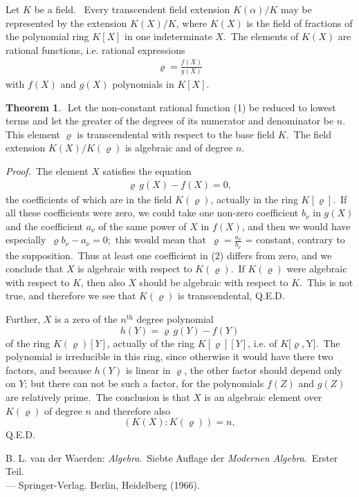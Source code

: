 \documentclass[12pt]{article}
\theoremstyle{definition}
\newtheorem*{thmplain}{Theorem}
\begin{document}
Let $K$ be a field. \, Every  transcendent field extension $K(\alpha)/K$ may be represented by the extension $K(X)/K$, where $K(X)$ is the field of fractions of the polynomial ring $K[X]$ in one indeterminate $X$. \,The elements of $K(X)$ are rational functions, i.e. rational expressions
\begin{align}
\varrho = \frac{f(X)}{g(X)}
\end{align}
with $f(X)$ and $g(X)$ polynomials in $K[X]$.

\begin{thmplain}
\,\,Let the non-constant rational function (1) be reduced to lowest terms and let the greater of the degrees of its numerator and denominator be $n$. \,This element $\varrho$ is transcendental with respect to the base field $K$. \,The field extension $K(X)/K(\varrho)$ is algebraic and of degree $n$.
\end{thmplain}

{\em Proof.}\, The element $X$ satisfies the equation
\begin{align}
                \varrho\,g(X)\!-\!f(X) = 0,
\end{align}
the coefficients of which are in the field $K(\varrho)$, actually in the ring $K[\varrho]$.\, If all these coefficients were zero, we could take one non-zero coefficient $b_\nu$ in $g(X)$ and the coefficient $a_\nu$ of the same power of $X$ in $f(X)$, and then we would have especially\, $\varrho b_\nu\!-a_\nu = 0$;\, this would mean that\, $\varrho = \frac{a_\nu}{b_\nu}$ = constant, contrary to the supposition.\, Thus at least one coefficient in (2) differs from zero, and we conclude that $X$ is algebraic with respect to $K(\varrho)$.\, If $K(\varrho)$ were algebraic with respect to $K$, then also $X$ should be algebraic with respect to $K$.\, This is not true, and therefore we see that $K(\varrho)$ is transcendental, Q.E.D.

Further, $X$ is a zero of the $n^\mathrm{th}$ degree polynomial
               $$h(Y) = \varrho\,g(Y)\!-\!f(Y)$$
of the ring $K(\varrho)[Y]$, actually of the ring $K[\varrho][Y]$, i.e. of $K[\varrho$,\,Y].\, The polynomial is irreducible in this ring, since otherwise it would have there two factors, and because $h(Y)$ is linear in $\varrho$, the other factor should depend only on $Y$; but there can not be such a factor, for the polynomials $f(Z)$ and $g(Z)$ are relatively prime.\, The conclusion is that $X$ is an algebraic element over $K(\varrho)$ of degree $n$ and therefore also
     $$(K(X):K(\varrho)) = n,$$
Q.E.D.

\begin{thebibliography}{9}
 B. L. van der Waerden: {\em Algebra}.\, Siebte Auflage der {\em Modernen Algebra}.\, Erster Teil. \\--- Springer-Verlag. Berlin, Heidelberg (1966).
\end{thebibliography}
\end{document}
